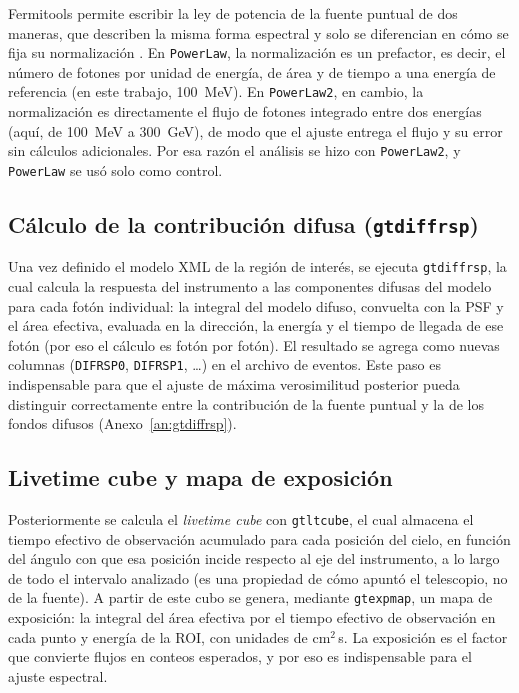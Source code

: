 Fermitools permite escribir la ley de potencia de la fuente puntual de dos maneras, que describen la misma forma espectral y solo se diferencian en cómo se fija su normalización \cite{FSSCCicerone}. En \texttt{PowerLaw}, la normalización es un prefactor, es decir, el número de fotones por unidad de energía, de área y de tiempo a una energía de referencia (en este trabajo, 100~MeV). En \texttt{PowerLaw2}, en cambio, la normalización es directamente el flujo de fotones integrado entre dos energías (aquí, de 100~MeV a 300~GeV), de modo que el ajuste entrega el flujo y su error sin cálculos adicionales. Por esa razón el análisis se hizo con \texttt{PowerLaw2}, y \texttt{PowerLaw} se usó solo como control.

\subsection{Cálculo de la contribución difusa (\texttt{gtdiffrsp})}

Una vez definido el modelo XML de la región de interés, se ejecuta \texttt{gtdiffrsp}, la cual calcula la respuesta del instrumento a las componentes difusas del modelo para cada fotón individual: la integral del modelo difuso, convuelta con la PSF y el área efectiva, evaluada en la dirección, la energía y el tiempo de llegada de ese fotón (por eso el cálculo es fotón por fotón). El resultado se agrega como nuevas columnas (\texttt{DIFRSP0}, \texttt{DIFRSP1}, \dots) en el archivo de eventos. Este paso es indispensable para que el ajuste de máxima verosimilitud posterior pueda distinguir correctamente entre la contribución de la fuente puntual y la de los fondos difusos (Anexo~\ref{an:gtdiffrsp}).

\subsection{Livetime cube y mapa de exposición}

Posteriormente se calcula el \textit{livetime cube} con \texttt{gtltcube}, el cual almacena el tiempo efectivo de observación acumulado para cada posición del cielo, en función del ángulo con que esa posición incide respecto al eje del instrumento, a lo largo de todo el intervalo analizado (es una propiedad de cómo apuntó el telescopio, no de la fuente). A partir de este cubo se genera, mediante \texttt{gtexpmap}, un mapa de exposición: la integral del área efectiva por el tiempo efectivo de observación en cada punto y energía de la ROI, con unidades de cm$^2\,$s. La exposición es el factor que convierte flujos en conteos esperados, y por eso es indispensable para el ajuste espectral.

